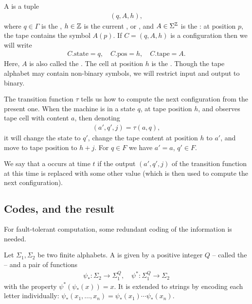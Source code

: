 \documentclass[12pt]{memoir}
\newcommand{\h}{h}
\newcommand{\pos}{\mathrm{pos}}
\newcommand{\state}{\mathrm{state}}
\newcommand{\tape}{\mathrm{tape}}
\begin{document}
    A  is a tuple
        \begin{align*}
             (q,A,\h),
        \end{align*}
    where \( q\in\Gamma \) is the , 
\( \h\in\bbZ \) is the current , or ,
and \( A\in\Sigma^{\mathbb{Z}} \) is the : 
at position \( p \), the tape contains the symbol \( A(p) \).
If \( C=(q,A,\h) \) is a configuration then we will write
        \begin{align*}
             C.\state=q,\quad C.\pos=\h, \quad C.\tape=A.
        \end{align*}
    Here, \( A \) is also called the .
    The cell at position \( \h \) is the  .
Though the tape alphabet may contain
non-binary symbols, we will restrict input and output to binary.

    The transition function \( \tau \) tells us how to compute the next
    configuration from the present one.
    When the machine is in a state \( q \), at tape position \( \h \), and
    observes tape cell with content \( a \), then denoting
         \begin{align*}
           (a',q',j)=\tau(a,q),
         \end{align*}
    it will change the state to \( q' \), change the
    tape content at position \( \h \) to \( a' \), and move to tape position to \( \h+j \).
    For \( q\in F \) we have \( a'=a \), \( q'\in F \).


\begin{definition}[Fault]\label{def:fault}
    We say that a  occurs at time \( t \) if the output \( (a',q',j) \) of the
    transition function at this time is replaced with some other value
    (which is then used to compute the next configuration).
\end{definition}


\subsection{Codes, and the result}

For fault-tolerant computation, some redundant coding of the information is needed.

\begin{definition}[Codes]\label{def:codes}
    Let \( \Sigma_{1},\Sigma_{2} \) be two finite alphabets.
    A  is given by a positive integer \( Q \) -- called
    the  -- and a pair of functions
    \begin{align*}
            \psi_{*} :\Sigma_{2}\to\Sigma_{1}^{Q},
            \quad
            \psi^{*}:\Sigma_{1}^{Q}\to\Sigma_{2}
    \end{align*}
    with the property \( \psi^{*}(\psi_{*}(x))=x \).
It is extended to strings by encoding each letter individually:
\( \psi_{*}(x_{1},\dots,x_{n})=\psi_{*}(x_{1})\dotsm\psi_{*}(x_{n}) \).
\end{definition}
\end{document}
